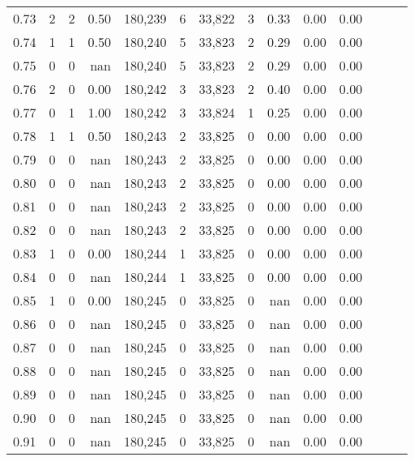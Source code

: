 \begin{tabular}{rrrrrrrrrrrrrr}
0.73 &      2 &      2 &  0.50 &  180,239 &        6 &  33,822 &       3 &  0.33 &  0.00 &      0.00 \\
0.74 &      1 &      1 &  0.50 &  180,240 &        5 &  33,823 &       2 &  0.29 &  0.00 &      0.00 \\
0.75 &      0 &      0 &   nan &  180,240 &        5 &  33,823 &       2 &  0.29 &  0.00 &      0.00 \\
0.76 &      2 &      0 &  0.00 &  180,242 &        3 &  33,823 &       2 &  0.40 &  0.00 &      0.00 \\
0.77 &      0 &      1 &  1.00 &  180,242 &        3 &  33,824 &       1 &  0.25 &  0.00 &      0.00 \\
0.78 &      1 &      1 &  0.50 &  180,243 &        2 &  33,825 &       0 &  0.00 &  0.00 &      0.00 \\
0.79 &      0 &      0 &   nan &  180,243 &        2 &  33,825 &       0 &  0.00 &  0.00 &      0.00 \\
0.80 &      0 &      0 &   nan &  180,243 &        2 &  33,825 &       0 &  0.00 &  0.00 &      0.00 \\
0.81 &      0 &      0 &   nan &  180,243 &        2 &  33,825 &       0 &  0.00 &  0.00 &      0.00 \\
0.82 &      0 &      0 &   nan &  180,243 &        2 &  33,825 &       0 &  0.00 &  0.00 &      0.00 \\
0.83 &      1 &      0 &  0.00 &  180,244 &        1 &  33,825 &       0 &  0.00 &  0.00 &      0.00 \\
0.84 &      0 &      0 &   nan &  180,244 &        1 &  33,825 &       0 &  0.00 &  0.00 &      0.00 \\
0.85 &      1 &      0 &  0.00 &  180,245 &        0 &  33,825 &       0 &   nan &  0.00 &      0.00 \\
0.86 &      0 &      0 &   nan &  180,245 &        0 &  33,825 &       0 &   nan &  0.00 &      0.00 \\
0.87 &      0 &      0 &   nan &  180,245 &        0 &  33,825 &       0 &   nan &  0.00 &      0.00 \\
0.88 &      0 &      0 &   nan &  180,245 &        0 &  33,825 &       0 &   nan &  0.00 &      0.00 \\
0.89 &      0 &      0 &   nan &  180,245 &        0 &  33,825 &       0 &   nan &  0.00 &      0.00 \\
0.90 &      0 &      0 &   nan &  180,245 &        0 &  33,825 &       0 &   nan &  0.00 &      0.00 \\
0.91 &      0 &      0 &   nan &  180,245 &        0 &  33,825 &       0 &   nan &  0.00 &      0.00 \\

\end{tabular}
